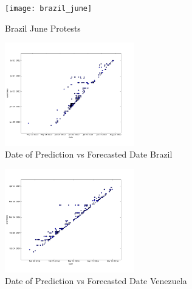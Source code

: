 \begin{figure}
    \texttt{[image: brazil\_june]}
    \caption{Brazil June Protests}
\end{figure}

\begin{figure}
    \includegraphics[width=0.5\textwidth]{../figures/eventDateVsDate_brazil.png}
    \caption{Date of Prediction vs Forecasted Date Brazil}
\end{figure}

\begin{figure}
    \includegraphics[width=0.5\textwidth]{../figures/eventDateVsDate_venezuela.png}
    \caption{Date of Prediction vs Forecasted Date Venezuela}
\end{figure}





